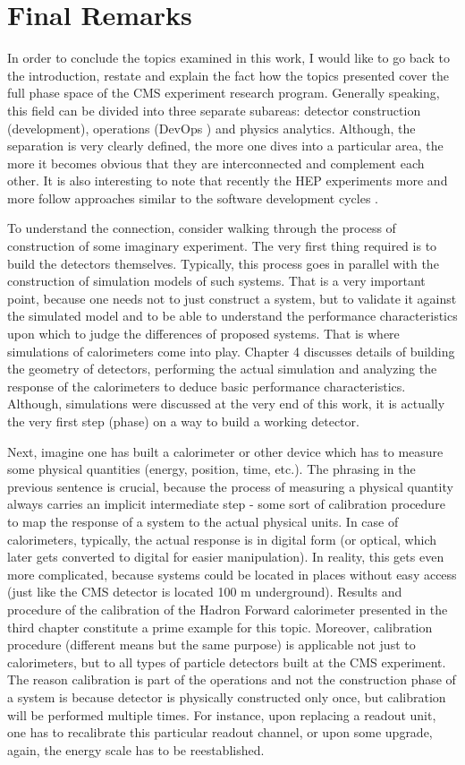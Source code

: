 \chapter{Final Remarks} \label{chapter:Remarks}
In order to conclude the topics examined in this work, I would like to go back to the introduction, restate and explain the fact how the topics presented cover the full phase space of the CMS experiment research program. Generally speaking, this field can be divided into three separate subareas: detector construction (development), operations (DevOps \cite{DevOps}) and physics analytics. Although, the separation is very clearly defined, the more one dives into a particular area, the more it becomes obvious that they are interconnected and complement each other. It is also interesting to note that recently the HEP experiments more and more follow approaches similar to the software development cycles \cite{SoftCycles}.

To understand the connection, consider walking through the process of construction of some imaginary experiment. The very first thing required is to build the detectors themselves. Typically, this process goes in parallel with the construction of simulation models of such systems. That is a very important point, because one needs not to just construct a system, but to validate it against the simulated model and to be able to understand the performance characteristics upon which to judge the differences of proposed systems. That is where simulations of calorimeters come into play. Chapter 4 discusses details of building the geometry of detectors, performing the actual simulation and analyzing the response of the calorimeters to deduce basic performance characteristics. Although, simulations were discussed at the very end of this work, it is actually the very first step (phase) on a way to build a working detector.

Next, imagine one has built a calorimeter or other device which has to measure some physical quantities (energy, position, time, etc.). The phrasing in the previous sentence is crucial, because the process of measuring a physical quantity always carries an implicit intermediate step - some sort of calibration procedure to map the response of a system to the actual physical units. In case of calorimeters, typically, the actual response is in digital form (or optical, which later gets converted to digital for easier manipulation). In reality, this gets even more complicated, because systems could be located in places without easy access (just like the CMS detector is located 100 m underground). Results and procedure of the calibration of the Hadron Forward calorimeter presented in the third chapter constitute a prime example for this topic. Moreover, calibration procedure (different means but the same purpose) is applicable not just to calorimeters, but to all types of particle detectors built at the CMS experiment. The reason calibration is part of the operations and not the construction phase of a system is because detector is physically constructed only once, but calibration will be performed multiple times. For instance, upon replacing a readout unit, one has to recalibrate this particular readout channel, or upon some upgrade, again, the energy scale has to be reestablished.

